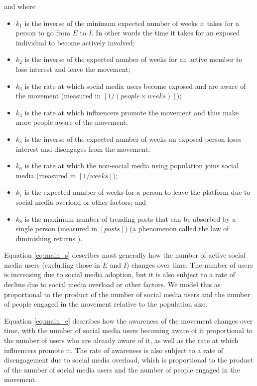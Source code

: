 \documentclass{article}
\begin{document}
    and where
    \begin{itemize}
        \item $k_1$ is the inverse of the minimum expected number of weeks it takes for a person to go from $E$ to $I$. In other words the time it takes for an exposed individual to become actively involved;
        \item $k_2$ is the inverse of the expected number of weeks for an active member to lose interest and leave the movement;
        \item $k_3$ is the rate at which social media users become exposed and are aware of the movement (measured in $[1/{(people\times weeks)}]$);
        \item $k_4$ is the rate at which influencers promote the movement and thus make more people aware of the movement; 
        \item $k_5$ is the inverse of the expected number of weeks an exposed person loses interest and disengages from the movement;
        \item $k_6$ is the rate at which the non-social media using population joins social media (measured in $[1/{weeks}]$);
        \item $k_7$ is the expected number of weeks for a person to leave the platform due to social media overload or other factors; and
        \item $k_8$ is the maximum number of trending posts that can be absorbed by a single person (measured in $[posts]$) (a phenomenon called the law of diminishing returns \cite{dhaoui_brand_2021}).
    \end{itemize}

    Equation \ref{eq:main_s} describes most generally how the number of active social media users (excluding those in $E$ and $I$) changes over time. The number of users is increasing due to social media adoption, but it is also subject to a rate of decline due to social media overload or other factors. We model this as proportional to the product of the number of social media users and the number of people engaged in the movement relative to the population size. 

    Equation \ref{eq:main_e} describes how the awareness of the movement changes over time, with the number of social media users becoming aware of it proportional to the number of users who are already aware of it, as well as the rate at which influencers promote it. The rate of awareness is also subject to a rate of disengagement due to social media overload, which is proportional to the product of the number of social media users and the number of people engaged in the movement. 
    
\end{document}

